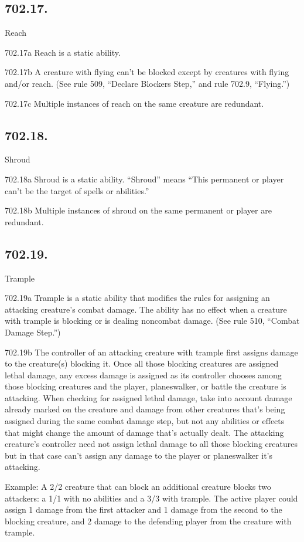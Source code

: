 \subsection*{702.17.}
Reach

702.17a Reach is a static ability.

702.17b A creature with flying can’t be blocked except by creatures with flying and/or reach. (See rule 509, “Declare Blockers Step,” and rule 702.9, “Flying.”)

702.17c Multiple instances of reach on the same creature are redundant.

\subsection*{702.18.}
Shroud

702.18a Shroud is a static ability. “Shroud” means “This permanent or player can’t be the target of spells or abilities.”

702.18b Multiple instances of shroud on the same permanent or player are redundant.

\subsection*{702.19.}
Trample

702.19a Trample is a static ability that modifies the rules for assigning an attacking creature’s combat damage. The ability has no effect when a creature with trample is blocking or is dealing noncombat damage. (See rule 510, “Combat Damage Step.”)

702.19b The controller of an attacking creature with trample first assigns damage to the creature(s) blocking it. Once all those blocking creatures are assigned lethal damage, any excess damage is assigned as its controller chooses among those blocking creatures and the player, planeswalker, or battle the creature is attacking. When checking for assigned lethal damage, take into account damage already marked on the creature and damage from other creatures that’s being assigned during the same combat damage step, but not any abilities or effects that might change the amount of damage that’s actually dealt. The attacking creature’s controller need not assign lethal damage to all those blocking creatures but in that case can’t assign any damage to the player or planeswalker it’s attacking.

Example: A 2/2 creature that can block an additional creature blocks two attackers: a 1/1 with no abilities and a 3/3 with trample. The active player could assign 1 damage from the first attacker and 1 damage from the second to the blocking creature, and 2 damage to the defending player from the creature with trample.

